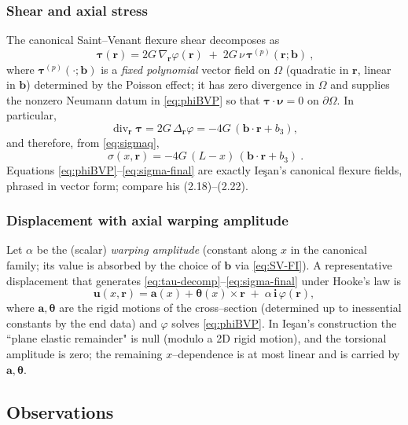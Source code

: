 \subsubsection*{Shear and axial stress}
The canonical Saint–Venant flexure shear decomposes as
\begin{equation}
\boxed{\ \bm{\tau}(\bm{r})=2G\,\nabla_{\!\bm{r}}\varphi(\bm{r})\;+\;2G\,\nu\,\bm{\tau}^{\!(p)}(\bm{r};\bm{b})\ },
\label{eq:tau-decomp}
\end{equation}
where $\bm{\tau}^{\!(p)}(\cdot;\bm{b})$ is a \emph{fixed polynomial} vector field on $\Omega$ (quadratic in $\bm{r}$, linear in $\bm{b}$) determined by the Poisson effect; it has zero divergence in $\Omega$ and supplies the nonzero Neumann datum in \eqref{eq:phiBVP} so that $\bm{\tau}\cdot\bm{\nu}=0$ on $\partial\Omega$. In particular,
\[
\operatorname{div}_{\!\bm{r}}\bm{\tau}=2G\,\Delta_{\!\bm{r}}\varphi=-4G\,(\bm{b}\cdot\bm{r}+b_3),
\]
and therefore, from \eqref{eq:sigmaq},
\begin{equation}
\boxed{\ \sigma(x,\bm{r})=-4G\,(L-x)\,(\bm{b}\cdot\bm{r}+b_3)\ }.
\label{eq:sigma-final}
\end{equation}
Equations \eqref{eq:phiBVP}–\eqref{eq:sigma-final} are exactly Ieşan’s canonical flexure fields, phrased in vector form; compare his (2.18)–(2.22).

\subsubsection*{Displacement with axial warping amplitude}
Let $\alpha$ be the (scalar) \emph{warping amplitude} (constant along $x$ in the canonical family; its value is absorbed by the choice of $\bm{b}$ via \eqref{eq:SV-FI}). A representative displacement that generates \eqref{eq:tau-decomp}–\eqref{eq:sigma-final} under Hooke’s law is
\begin{equation}
\bm{u}(x,\bm{r})=\bm{a}(x)+\bm{\theta}(x)\times\bm{r}\;+\;\alpha\,\mathbf{i}\,\varphi(\bm{r}),
\label{eq:svf-disp}
\end{equation}
where $\bm{a},\bm{\theta}$ are the rigid motions of the cross–section (determined up to inessential constants by the end data) and $\varphi$ solves \eqref{eq:phiBVP}. In Ieşan’s construction the ``plane elastic remainder" is null (modulo a 2D rigid motion), and the torsional amplitude is zero; the remaining $x$–dependence is at most linear and is carried by $\bm{a},\bm{\theta}$.

\subsection*{Observations}

